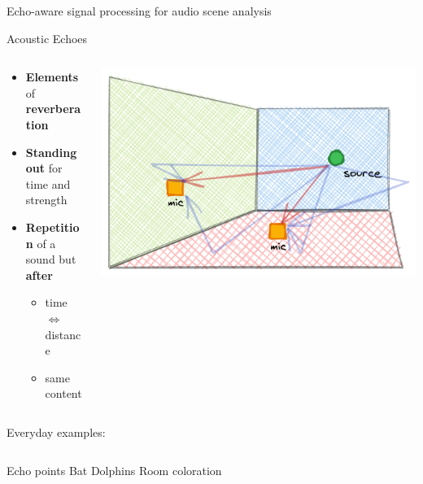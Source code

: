 \begin{frame}[t]{\alert{Echo-aware signal processing for audio scene analysis}}
{\begin{mydefblock}{Acoustic Echoes}
        \vspace{-3mm}
        \begin{columns}[onlytextwidth]
            \begin{column}{0.60\textwidth}
                \begin{itemize}
                    \item \textbf{Elements} of \textbf{reverberation}
                    \item \textbf{Standing out} for time and strength
                    \item \textbf{Repetition} of a sound but \textbf{after}
                    \begin{itemize}
                        \item time $\Leftrightarrow$ distance
                        \item same content
                    \end{itemize}
                \end{itemize}
            \end{column}
            \begin{column}{0.38\textwidth}
                \centering
                \includegraphics[width=.8\textwidth]{figures/echoes}
            \end{column}

        \end{columns}
    \end{mydefblock}
    }

    \begin{block}{Everyday examples:}

        \vspace*{2mm}
        \begin{columns}[T,onlytextwidth]
            Echo points
            Bat
            Dolphins
            Room coloration
        \end{columns}
    \end{block}



\end{frame}
